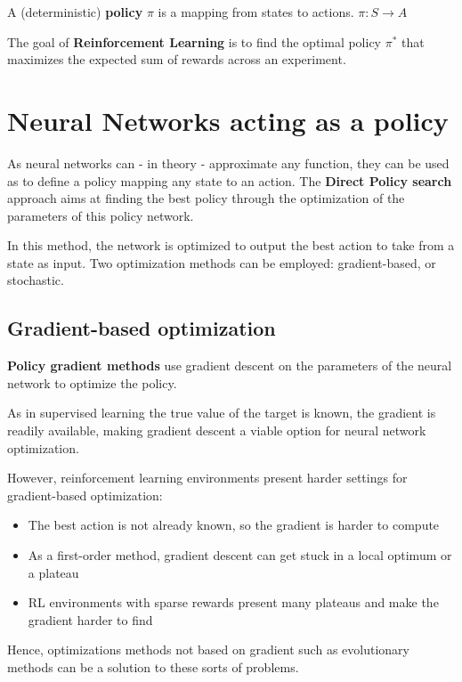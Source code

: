 A (deterministic) \textbf{policy} $\pi$ is a mapping from states to actions. $\pi: S \longrightarrow A$

The goal of \textbf{Reinforcement Learning} is to find the optimal policy $\pi^*$ that maximizes the expected sum of rewards across an experiment. 

\section{Neural Networks acting as a policy}

As neural networks \cite{perceptron} can - in theory - approximate any function, they can be used as to define a policy mapping any state to an action. The \textbf{Direct Policy search} approach aims at finding the best policy through the optimization of the parameters of this policy network.

In this method, the network is optimized to output the best action to take from a state as input. Two optimization methods can be employed: gradient-based, or stochastic.

\subsection{Gradient-based optimization}

\textbf{Policy gradient methods} use gradient descent \cite{sgd} on the parameters of the neural network to optimize the policy. 

As in supervised learning the true value of the target is known, the gradient is readily available, making gradient descent a viable option for neural network optimization. 

However, reinforcement learning environments present harder settings for gradient-based optimization:

\begin{itemize}
    \item The best action is not already known, so the gradient is harder to compute
    \item As a first-order method, gradient descent can get stuck in a local optimum or a plateau
    \item RL environments with sparse rewards present many plateaus and make the gradient harder to find
\end{itemize}

Hence, optimizations methods not based on gradient such as evolutionary methods can be a solution to these sorts of problems.

